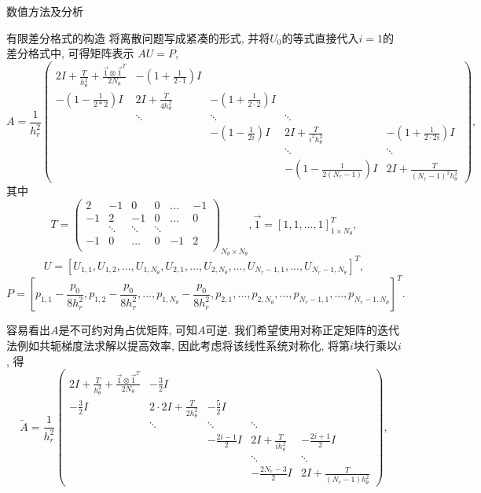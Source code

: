 \documentclass{article}
\begin{document}
\begin{section}{数值方法及分析}
\begin{subsection}{有限差分格式的构造}
        将离散问题写成紧凑的形式, 并将$U_0$的等式直接代入$i=1$的差分格式中, 可得矩阵表示 $AU=P$,
        $$A=\frac{1}{h_r^2}\begin{pmatrix}
            2I+\displaystyle\frac{T}{h_\theta^2} +\frac{\vec{1}\otimes\vec{1}^T}{2N_\theta} & \displaystyle-(1+\frac{1}{2\cdot 1})I  & & & \\
            \displaystyle-(1-\frac{1}{2*2})I & 2I+\displaystyle\frac{T}{4h_\theta^2} & \displaystyle-(1+\frac{1}{2\cdot 2})I & & \\
             & \ddots & \ddots & \ddots & \\
             & & \displaystyle-(1-\frac{1}{2i})I & 2I+\displaystyle\frac{T}{i^2h_\theta^2} & \displaystyle-(1+\frac{1}{2\cdot 2i})I \\
             & & & \ddots &\ddots \\
             & & & \displaystyle-(1-\frac{1}{2(N_r-1)})I & 2I+\displaystyle\frac{T}{(N_r-1)^2h_\theta^2} 
        \end{pmatrix}, $$
        其中
        $$T=\begin{pmatrix}
            2 & -1 & 0 & 0 &\dots & -1 \\
            -1 & 2 & -1 & 0 &\dots & 0 \\
             & \ddots &\ddots &\ddots & & \\
             -1 & 0 & \dots & 0 & -1 & 2 \\
        \end{pmatrix}_{N_\theta\times N_\theta}, \vec{1} = [1,1,...,1]^T_{1\times N_\theta},$$
        $$ U = [U_{1,1},U_{1,2},...,U_{1,N_\theta},U_{2,1},...,U_{2,N_\theta},...,U_{N_r-1,1},...,U_{N_r-1,N_\theta}]^T,$$
        $$ P = [p_{1,1}-\frac{p_0}{8h_r^2},p_{1,2}-\frac{p_0}{8h_r^2},...,p_{1,N_\theta}-\frac{p_0}{8h_r^2},p_{2,1},...,p_{2,N_\theta},...,p_{N_r-1,1},...,p_{N_r-1,N_\theta}]^T.$$

        容易看出$A$是不可约对角占优矩阵, 可知$A$可逆. 我们希望使用对称正定矩阵的迭代法例如共轭梯度法求解以提高效率,
         因此考虑将该线性系统对称化, 将第$i$块行乘以$i$, 得
         $$\tilde{A}=\frac{1}{h_r^2}\begin{pmatrix}
            2I+\displaystyle\frac{T}{h_\theta^2} +\frac{\vec{1}\otimes\vec{1}^T}{2N_\theta} & \displaystyle-\frac{3}{2}I  & & & \\
            \displaystyle-\frac{3}{2}I & 2\cdot 2I+\displaystyle\frac{T}{2h_\theta^2} & \displaystyle-\frac{5}{2}I & & \\
             & \ddots & \ddots & \ddots & \\
             & & \displaystyle-\frac{2i-1}{2}I & 2I+\displaystyle\frac{T}{ih_\theta^2} & \displaystyle-\frac{2i+1}{2}I \\
             & & & \ddots &\ddots \\
             & & & \displaystyle-\frac{2N_r-3}{2}I & 2I+\displaystyle\frac{T}{(N_r-1)h_\theta^2} 
        \end{pmatrix}, $$


\end{subsection}
\end{section}
\end{document}
